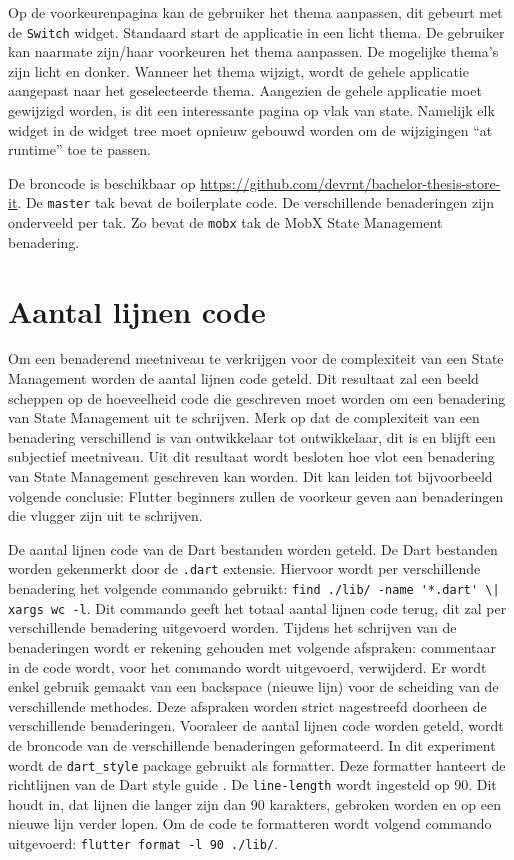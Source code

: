 Op de voorkeurenpagina kan de gebruiker het thema aanpassen, dit gebeurt met de \verb|Switch| widget. Standaard start de applicatie in een licht thema. De gebruiker kan naarmate zijn/haar voorkeuren het thema aanpassen. De mogelijke thema's zijn licht en donker.
Wanneer het thema wijzigt, wordt de gehele applicatie aangepast naar het geselecteerde thema. Aangezien de gehele applicatie moet gewijzigd worden, is dit een interessante pagina op vlak van state. Namelijk elk widget in de widget tree moet opnieuw gebouwd worden om de wijzigingen ``at runtime'' toe te passen.


De broncode is beschikbaar op \url{https://github.com/devrnt/bachelor-thesis-store-it}\autocite{Vrient2019}. De \verb|master| tak bevat de boilerplate code. De verschillende benaderingen zijn onderveeld per tak. Zo bevat de \verb|mobx| tak de MobX State Management benadering.

\section{Aantal lijnen code}
\label{ch:loc}
Om een benaderend meetniveau te verkrijgen voor de complexiteit van een State Management worden de aantal lijnen code geteld. Dit resultaat zal een beeld scheppen op de hoeveelheid code die geschreven moet worden om een benadering van State Management uit te schrijven. Merk op dat de complexiteit van een benadering verschillend is van ontwikkelaar tot ontwikkelaar, dit is en blijft een subjectief meetniveau. Uit dit resultaat wordt besloten hoe vlot een benadering van State Management geschreven kan worden. Dit kan leiden tot bijvoorbeeld volgende conclusie: Flutter beginners zullen de voorkeur geven aan benaderingen die vlugger zijn uit te schrijven. 

De aantal lijnen code van de Dart bestanden worden geteld. De Dart bestanden worden gekenmerkt door de \verb|.dart| extensie. Hiervoor wordt per verschillende benadering het volgende commando gebruikt: \verb=find ./lib/ -name '*.dart' \| xargs wc -l=. Dit commando geeft het totaal aantal lijnen code terug, dit zal per verschillende benadering uitgevoerd worden. \newline 
Tijdens het schrijven van de benaderingen wordt er rekening gehouden met volgende afspraken: commentaar in de code wordt, voor het commando wordt uitgevoerd, verwijderd. Er wordt enkel gebruik gemaakt van een backspace (nieuwe lijn) voor de scheiding van de verschillende methodes. Deze afspraken worden strict nagestreefd doorheen de verschillende benaderingen. \newline
\newline
Vooraleer de aantal lijnen code worden geteld, wordt de broncode van de verschillende benaderingen geformateerd. In dit experiment wordt de \verb|dart_style| package gebruikt als formatter. Deze formatter hanteert de richtlijnen van de Dart style guide \autocite{Dart2019a}. De \verb|line-length| wordt ingesteld op 90. Dit houdt in, dat lijnen die langer zijn dan 90 karakters, gebroken worden en op een nieuwe lijn verder lopen. Om de code te formatteren wordt volgend commando uitgevoerd: \verb|flutter format -l 90 ./lib/|.


